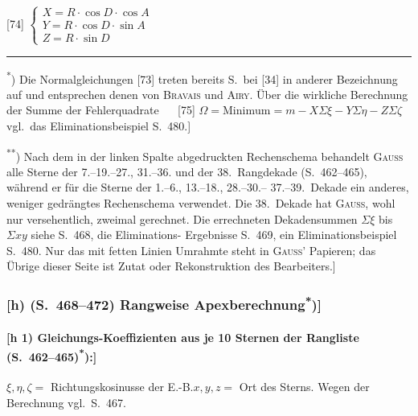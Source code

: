 \documentclass[12pt,a4paper]{article}
\theoremstyle{plain}
\theoremstyle{definition}
\theoremstyle{remark}
\begin{document}
\begin{small}
\begin{center}
[74] $\left\{\begin{array}{l}
X = R\cdot\cos D\cdot\cos A\\
Y = R\cdot\cos D\cdot\sin A\\
Z = R\cdot\sin D
\end{array}\right.$
\end{center}
\end{small}

\medskip
\noindent\rule{\textwidth}{0.4pt}
\begin{footnotesize}
\textsuperscript{*}) Die Normalgleichungen [73] treten bereits S.~bei [34] in anderer
Bezeichnung auf und entsprechen denen von \textsc{Bravais} und \textsc{Airy}.
\"Uber die wirkliche Berechnung der Summe der Fehlerquadrate
$\quad$ [75] $\Omega = \text{Minimum} = m - X\Sigma\xi - Y\Sigma\eta - Z\Sigma\zeta$
vgl.~das Eliminationsbeispiel S.~480.]

\textsuperscript{**}) Nach dem in der linken Spalte abgedruckten Rechenschema behandelt
\textsc{Gau\ss} alle Sterne der 7.--19.--27., 31.--36. und der 38.~Rangdekade
(S.~462--465), w\"ahrend er f\"ur die Sterne der 1.--6., 13.--18., 28.--30.--
37.--39.~Dekade ein anderes, weniger gedr\"angtes Rechenschema verwendet.
Die 38.~Dekade hat \textsc{Gau\ss}, wohl nur versehentlich, zweimal gerechnet.
Die errechneten Dekadensummen $\Sigma\xi$ bis $\Sigma xy$ siehe S.~468, die Eliminations-
Ergebnisse S.~469, ein Eliminationsbeispiel S.~480. Nur das mit fetten
Linien Umrahmte steht in \textsc{Gau\ss'} Papieren; das \"Ubrige dieser Seite
ist Zutat oder Rekonstruktion des Bearbeiters.]
\end{footnotesize}


\newpage
\subsubsection*{[h) (S.~468--472) Rangweise Apexberechnung\textsuperscript{*})]}

\paragraph*{[h 1) Gleichungs-Koeffizienten aus je 10 Sternen der Rangliste (S.~462--465)\textsuperscript{*}):]}

\begin{small}
\begin{center}
$\xi, \eta, \zeta =$ Richtungskosinusse der E.-B.\hspace{1cm}$x, y, z =$ Ort des Sterns.
Wegen der Berechnung vgl.~S.~467.
\end{center}
\end{small}
\end{document}
